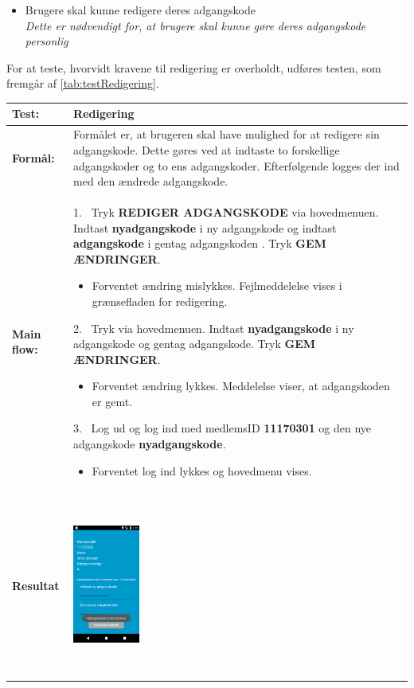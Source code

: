 \begin{itemize}
\item Brugere skal kunne redigere deres adgangskode
\\
\textit{Dette er nødvendigt for, at brugere skal kunne gøre deres adgangskode personlig}
\end{itemize}

\noindent
For at teste, hvorvidt kravene til redigering er overholdt, udføres testen, som fremgår af \autoref{tab:testRedigering}.

  \begin{longtable}{ | l | p{13cm} |} \hline
    \textbf{Test:} & Redigering \\ \hline
  \textbf{Formål:} & Formålet er, at brugeren skal have mulighed for at redigere sin adgangskode. Dette gøres ved at indtaste to forskellige adgangskoder og to ens adgangskoder. Efterfølgende logges der ind med den ændrede adgangskode.
 \\ \hline
 	\textbf{Main flow:} & 1.~ Tryk \textbf{REDIGER ADGANGSKODE} via hovedmenuen. Indtast \textbf{nyadgangskode} i ny adgangskode og indtast \textbf{adgangskode} i gentag adgangskoden . Tryk \textbf{GEM ÆNDRINGER}.   
 	\begin{itemize} [label={\checkmark}]
 	\item Forventet ændring mislykkes. Fejlmeddelelse vises i grænsefladen for redigering.
 	\end{itemize}	
 	2.~ Tryk \text{REDIGER ADGANGSKODE} via hovedmenuen. Indtast \textbf{nyadgangskode} i ny adgangskode og gentag adgangskode. Tryk \textbf{GEM ÆNDRINGER}. 
 	\begin{itemize}[label={\checkmark}]
 	\item Forventet ændring lykkes. Meddelelse viser, at adgangskoden er gemt. 
 	\end{itemize}
 	3.~ Log ud og log ind med medlemsID \textbf{11170301} og den nye adgangskode \textbf{nyadgangskode}.
 	\begin{itemize}[label={\checkmark}]
 	\item Forventet log ind lykkes og hovedmenu vises. 
	\end{itemize} \\ \hline
\textbf{Resultat} &
    \raisebox{-\totalheight}    {\includegraphics[width=0.20\textwidth, height=60mm]{figures/test/redigering2}} 

\end{longtable}
